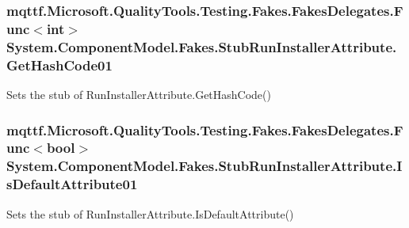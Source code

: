 \hypertarget{class_system_1_1_component_model_1_1_fakes_1_1_stub_run_installer_attribute_a8546e385f7aa35ec88fbac1875a34e8d}{
\subsubsection[{Get\-Hash\-Code01}]{\setlength{\rightskip}{0pt plus 5cm}mqttf.\-Microsoft.\-Quality\-Tools.\-Testing.\-Fakes.\-Fakes\-Delegates.\-Func$<$int$>$ System.\-Component\-Model.\-Fakes.\-Stub\-Run\-Installer\-Attribute.\-Get\-Hash\-Code01}}\label{class_system_1_1_component_model_1_1_fakes_1_1_stub_run_installer_attribute_a8546e385f7aa35ec88fbac1875a34e8d}


Sets the stub of Run\-Installer\-Attribute.\-Get\-Hash\-Code()

\hypertarget{class_system_1_1_component_model_1_1_fakes_1_1_stub_run_installer_attribute_a870d3355819ab4319c9cce16f693f93f}{
\subsubsection[{Is\-Default\-Attribute01}]{\setlength{\rightskip}{0pt plus 5cm}mqttf.\-Microsoft.\-Quality\-Tools.\-Testing.\-Fakes.\-Fakes\-Delegates.\-Func$<$bool$>$ System.\-Component\-Model.\-Fakes.\-Stub\-Run\-Installer\-Attribute.\-Is\-Default\-Attribute01}}\label{class_system_1_1_component_model_1_1_fakes_1_1_stub_run_installer_attribute_a870d3355819ab4319c9cce16f693f93f}


Sets the stub of Run\-Installer\-Attribute.\-Is\-Default\-Attribute()

